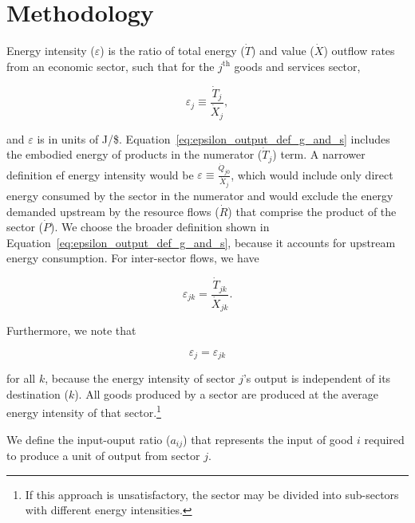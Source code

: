 \section{Methodology}

Energy intensity ($\varepsilon$)
is the ratio 
of total energy ($\dot{T}$) 
and value ($\dot{X}$) outflow rates 
from an economic sector, 
such that for the $j^{\mathrm{th}}$ goods and services sector,

\begin{equation} \label{eq:epsilon_output_def_g_and_s}
	\varepsilon_{j} \equiv \frac{\dot{T}_{j}}{\dot{X}_{j}},
\end{equation} 

\noindent{}and $\varepsilon$ is in units of J/\$.
Equation~\ref{eq:epsilon_output_def_g_and_s}
includes the embodied energy of products in the numerator ($\dot{T}_{j}$) term. 
A narrower definition ef energy intensity would be 
$\varepsilon \equiv \frac{\dot{Q}_{j0}}{\dot{X}_{j}}$,
which would include only direct energy consumed by the sector
in the numerator
and would exclude the energy demanded upstream by the 
resource flows ($\dot{R}$) that comprise the product of the sector ($\dot{P}$).
We choose the broader definition shown in
Equation~\ref{eq:epsilon_output_def_g_and_s},
because it accounts for upstream energy consumption.
For inter-sector flows, we have

\begin{equation} \label{eq:epsilon_transfers_1}
	\varepsilon_{jk} = \frac{\dot{T}_{jk}}{\dot{X}_{jk}}.
\end{equation}

\noindent{}Furthermore, we note that 

\begin{equation} \label{eq:epsilon_equiv_1}
	\varepsilon_{j} = \varepsilon_{jk}
\end{equation}

\noindent{}for all $k$, because the energy intensity 
of sector $j$'s output is independent of its destination ($k$). 
All goods produced by a sector 
are produced at the average energy intensity 
of that sector.\footnote{If this approach is unsatisfactory, 
the sector may be divided into sub-sectors 
with different energy intensities.}

We define the input-ouput ratio ($a_{ij}$)
that represents the input 
of good $i$ required to produce a unit of output from sector $j$.

